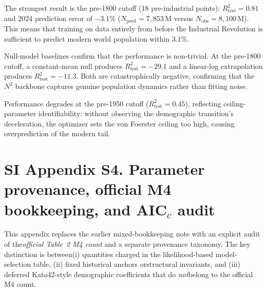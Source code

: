 \documentclass[11pt]{article}
\begin{document}
\noindent
The strongest result is the pre-1800 cutoff (18 pre-industrial points): $R^2_{\mathrm{test}}=0.81$ and 2024 prediction error of $-3.1\%$ ($N_{\mathrm{pred}}=7{,}853$\,M versus $N_{\mathrm{obs}}=8{,}100$\,M).
This means that training on data entirely from before the Industrial Revolution is sufficient to predict modern world population within 3.1\%.

Null-model baselines confirm that the performance is non-trivial.
At the pre-1800 cutoff, a constant-mean null produces $R^2_{\mathrm{test}}=-29.1$ and a linear-log extrapolation produces $R^2_{\mathrm{test}}=-11.3$.
Both are catastrophically negative, confirming that the $N^2$ backbone captures genuine population dynamics rather than fitting noise.

Performance degrades at the pre-1950 cutoff ($R^2_{\mathrm{test}}=0.45$), reflecting ceiling-parameter identifiability:
without observing the demographic transition's deceleration, the optimizer sets the von Foerster ceiling too high, causing overprediction of the modern tail.

\pagebreak




\section*{SI Appendix S4. Parameter provenance, official M4 bookkeeping, and AIC$_c$ audit}\label{sec:S4}
This appendix replaces the earlier mixed-bookkeeping note with an explicit audit of the\emph{official Table~2 M4 count} and a separate provenance taxonomy. The key distinction is between(i) quantities charged in the likelihood-based model-selection table, (ii) fixed historical anchors orstructural invariants, and (iii) deferred Kato42-style demographic coefficients that do \emph{not}belong to the official M4 count.
\end{document}
